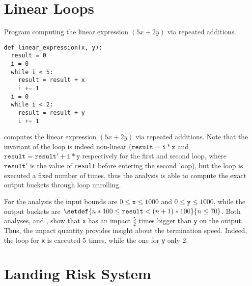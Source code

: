 \section{Linear Loops}


\begin{marginlisting}
  \caption{Program computing the linear expression $(5x + 2y)$ via repeated additions.}
  \vspace{0.9cm}
\begin{lstlisting}[style=mystyle,
  language=customPython,
  escapechar=\%,
]
def linear_expression(x, y):
  result = 0
  i = 0
  while i < 5:
    result = result + x
    i += 1
  i = 0
  while i < 2:
    result = result + y
    i += 1
\end{lstlisting}
\end{marginlisting}

 computes the linear expression $(5x + 2y)$ via repeated additions.
Note that the invariant of the loop is indeed non-linear ($\texttt{result} = \texttt{i} * \texttt{x}$ and $\texttt{result} = \texttt{result}' + \texttt{i} * \texttt{y}$ respectively for the first and second loop, where $\texttt{result}'$ is the value of \texttt{result} before entering the second loop), but the loop is executed a fixed number of times, thus the analysis is able to compute the exact output buckets through loop unrolling.

For the analysis the input bounds are $0 \le \texttt{x} \le 1000$ and $0 \le \texttt{y} \le 1000$, while the output buckets are $\setdef{n * 100 \le \texttt{result} < (n + 1) * 100}{n \le 70}$.
Both analyses, \outcomesname{} and \rangename, show that \texttt{x} has an impact $\frac{5}{2}$ times bigger than \texttt{y} on the output.
Thus, the impact quantity provides insight about the termination speed.
Indeed, the loop for \texttt{x} is executed 5 times, while the one for \texttt{y} only 2.


\section{Landing Risk System}




